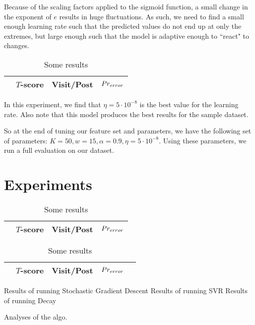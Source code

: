 Because of the scaling factors applied to the sigmoid function, a small change 
in the exponent of $e$ results in huge fluctuations. As such, we need to find a 
small enough learning rate such that the predicted values do not end up at only 
the extremes, but large enough such that the model is adaptive enough to 
``react" to changes.

\begin{table}
\begin{center}
\begin{tabular}{| l | c | c | c |}
\hline
& $T$-score			   &	Visit/Post & 	$Pr_{error}$\\
\hline
	
\hline
\end{tabular}
\end{center}
\caption{Some results}\label{tbl:par_tune_learning}
\end{table}

In this experiment, we find that $\eta=5\cdot10^{-8}$ is the best value for the 
learning rate. Also note that this model produces the best results for the 
sample dataset.


So at the end of tuning our feature set and parameters, we have the following 
set of parameters: $K = 50, w = 15, \alpha = 0.9, \eta = 5\cdot10^{-8}$. Using 
these parameters, we run a full evaluation on our dataset.

\section{Experiments}


\begin{table}
\begin{center}
\begin{tabular}{| l | c | c | c |}
\hline
& $T$-score			   &	Visit/Post & 	$Pr_{error}$\\
\hline
	
\hline
\end{tabular}
\end{center}
\caption{Some results}\label{tbl:full_eval}
\end{table}


\begin{table}
\begin{center}
\begin{tabular}{| l | c | c | c | l |}
\hline
& $T$-score			   &	Visit/Post & 	$Pr_{error}$ &\\
\hline
	
\hline
\end{tabular}
\end{center}
\caption{Some results}\label{tbl:diff_efal}
\end{table}



Results of running Stochastic Gradient Descent
Results of running SVR
Results of running Decay


Analyses of the algo.




